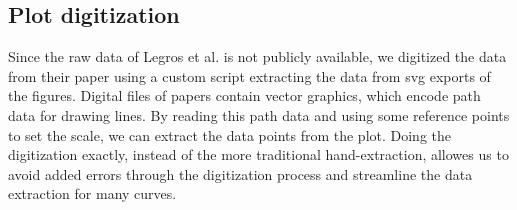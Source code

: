 \subsection{Plot digitization}
Since the raw data of Legros et al. is not publicly available, we digitized the data from their
paper using a custom script extracting the data from svg exports of the figures. Digital files of
papers contain vector graphics, which encode path data for drawing lines. By reading this path data
and using some reference points to set the scale, we can extract the data points from the plot.
Doing the digitization exactly, instead of the more traditional hand-extraction, allowes us to
avoid added errors through the digitization process and streamline the data extraction for many
curves.
